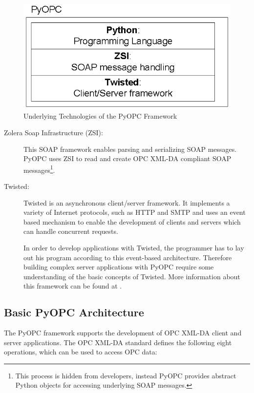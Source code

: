 \begin{figure}[ht]
\centering
\includegraphics[scale=0.7]{graphics/technologies.eps}
\caption{Underlying Technologies of the PyOPC Framework}
\label {technologies} 
\end{figure}

\begin{description}
\item[Zolera Soap Infrastructure (ZSI):] This SOAP framework enables
parsing and serializing SOAP messages. PyOPC uses ZSI to read and
create OPC XML-DA compliant SOAP messages\footnote{This process is
hidden from developers, instead PyOPC provides abstract Python objects
for accessing underlying SOAP messages.}.

\item[Twisted:] Twisted is an asynchronous client/server framework.
It implements a variety of Internet protocols, such as HTTP and SMTP
and uses an event based mechanism to enable the development of
clients and servers which can handle concurrent requests.

In order to develop applications with Twisted, the programmer has
to lay out his program according to this event-based architecture.
Therefore building complex server applications with PyOPC require
some understanding of the basic concepts of Twisted. More information
about this framework can be found at \cite{TWISTED}.
\end{description}

\subsection {Basic PyOPC Architecture}

The PyOPC framework supports the development of OPC XML-DA client and
server applications. The OPC XML-DA standard defines the following
eight operations, which can be used to access OPC data:


